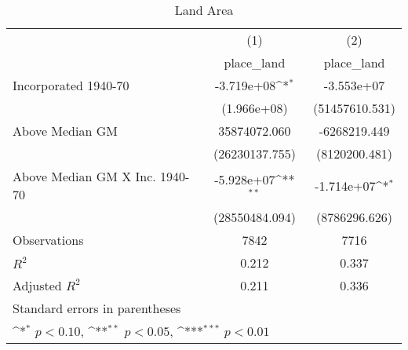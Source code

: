\begin{table}[htbp]\centering
\def\sym#1{\ifmmode^{#1}\else\(^{#1}\)\fi}
\caption{Land Area}
\begin{tabular}{l*{2}{c}}
\hline\hline
                    &\multicolumn{1}{c}{(1)}&\multicolumn{1}{c}{(2)}\\
                    &\multicolumn{1}{c}{place\_land}&\multicolumn{1}{c}{place\_land}\\
\hline
Incorporated 1940-70&  -3.719e+08\sym{*}  &  -3.553e+07         \\
                    & (1.966e+08)         &(51457610.531)         \\
[1em]
Above Median GM     &35874072.060         &-6268219.449         \\
                    &(26230137.755)         &(8120200.481)         \\
[1em]
Above Median GM X Inc. 1940-70&  -5.928e+07\sym{**} &  -1.714e+07\sym{*}  \\
                    &(28550484.094)         &(8786296.626)         \\
\hline
Observations        &        7842         &        7716         \\
\(R^{2}\)           &       0.212         &       0.337         \\
Adjusted \(R^{2}\)  &       0.211         &       0.336         \\
\hline\hline
\multicolumn{3}{l}{\footnotesize Standard errors in parentheses}\\
\multicolumn{3}{l}{\footnotesize \sym{*} \(p<0.10\), \sym{**} \(p<0.05\), \sym{***} \(p<0.01\)}\\
\end{tabular}
\end{table}
